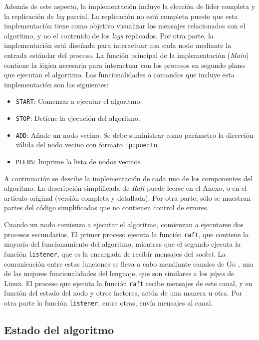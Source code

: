 Además de este aspecto, la implementación incluye la elección de líder completa y la replicación de \textit{log} parcial. La replicación no está completa puesto que esta implementación tiene como objetivo visualizar los mensajes relacionados con el algoritmo, y no el contenido de los \textit{logs} replicados. Por otra parte, la implementación está diseñada para interactuar con cada nodo mediante la entrada estándar del proceso. La función principal de la implementación (\textit{Main}) contiene la lógica necesaria para interactuar con los procesos en segundo plano que ejecutan el algoritmo. Las funcionalidades o comandos que incluye esta implementación son las siguientes:

\begin{itemize}
\item\texttt{START}: Comenzar a ejecutar el algoritmo.
\item\texttt{STOP}: Detiene la ejecución del algoritmo.
\item\texttt{ADD}: Añade un nodo vecino. Se debe suministrar como parámetro la dirección válida del nodo vecino con formato \texttt{ip:puerto}.
\item\texttt{PEERS}: Imprime la lista de nodos vecinos.
\end{itemize}

A continuación se descibe la implementación de cada uno de los componentes del algoritmo. La descripción simplificada de \textit{Raft} puede leerse en el Anexo, o en el artículo original \cite{raft1} (versión completa y detallada). Por otra parte, sólo se muestran partes del código simplificadas que no contienen control de errores.

Cuando un nodo comienza a ejecutar el algoritmo, comienzan a ejecutarse dos procesos secundarios. El primer proceso ejecuta la función \texttt{raft}, que contiene la mayoría del funcionamiento del algoritmo, mientras que el segundo ejecuta la función \texttt{listener}, que es la encargada de recibir mensajes del \textit{socket}. La comunicación entre estas funciones se lleva a cabo mendiante canales de Go \cite{gochannels}, una de las mejores funcionalidades del lenguaje, que son similares a los \textit{pipes} de Linux. El proceso que ejecuta la función \texttt{raft} recibe mensajes de este canal, y en función del estado del nodo y otros factores, actúa de una manera u otra. Por otra parte la función \texttt{listener}, entre otras, envía mensajes al canal.

\subsection{Estado del algoritmo}

